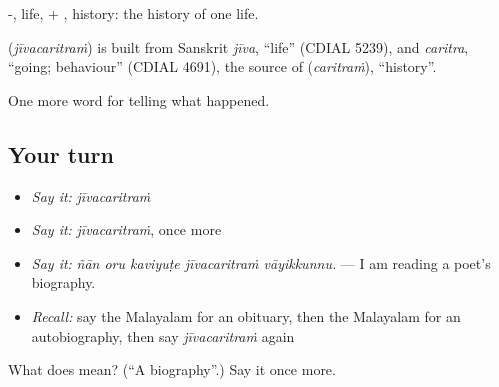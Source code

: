 -, life, + , history: the history of one life.

\begin{cousinweb}
\textbf{} (\emph{jīvacaritraṁ}) is built from Sanskrit \emph{jīva}, \textquotedblleft{}life\textquotedblright{} (CDIAL 5239), and \emph{caritra}, \textquotedblleft{}going; behaviour\textquotedblright{} (CDIAL 4691), the source of  (\emph{caritraṁ}), \textquotedblleft{}history\textquotedblright{}.
\end{cousinweb}

\begin{grammarlens}[title={What you've built}]
One more word for telling what happened.
\end{grammarlens}

\subsection*{Your turn}
\begin{itemize}
\raggedright
  \item \emph{Say it:} \emph{jīvacaritraṁ}
  \item \emph{Say it:} \emph{jīvacaritraṁ}, once more
  \item \emph{Say it:} \emph{ñān oru kaviyuṭe jīvacaritraṁ vāyikkunnu.} — I am reading a poet's biography.
  \item \emph{Recall:} say the Malayalam for an obituary, then the Malayalam for an autobiography, then say \emph{jīvacaritraṁ} again
\end{itemize}

\begin{tcolorbox}[breakable,colback=teal!4,colframe=teal!35!black,title={Before you move on}]
What does  mean? (\textquotedblleft{}A biography\textquotedblright{}.) Say it once more.
\end{tcolorbox}
